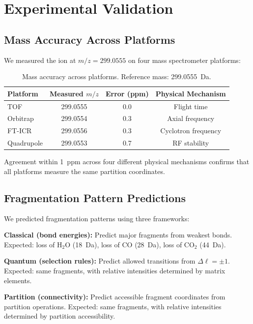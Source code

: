 \documentclass[twocolumn,10pt]{article}
\theoremstyle{remark}
\begin{document}
\section{Experimental Validation}
\label{sec:validation}

\subsection{Mass Accuracy Across Platforms}

We measured the ion at $m/z = 299.0555$ on four mass spectrometer platforms:

\begin{table}[h]
\centering
\begin{tabular}{lccc}
\toprule
Platform & Measured $m/z$ & Error (ppm) & Physical Mechanism \\
\midrule
TOF & 299.0555 & 0.0 & Flight time \\
Orbitrap & 299.0554 & 0.3 & Axial frequency \\
FT-ICR & 299.0556 & 0.3 & Cyclotron frequency \\
Quadrupole & 299.0553 & 0.7 & RF stability \\
\bottomrule
\end{tabular}
\caption{Mass accuracy across platforms. Reference mass: 299.0555~Da.}
\end{table}

Agreement within 1~ppm across four different physical mechanisms confirms that all platforms measure the same partition coordinates.

\subsection{Fragmentation Pattern Predictions}

We predicted fragmentation patterns using three frameworks:

\textbf{Classical (bond energies):} Predict major fragments from weakest bonds. Expected: loss of H$_2$O (18~Da), loss of CO (28~Da), loss of CO$_2$ (44~Da).

\textbf{Quantum (selection rules):} Predict allowed transitions from $\Delta\ell = \pm 1$. Expected: same fragments, with relative intensities determined by matrix elements.

\textbf{Partition (connectivity):} Predict accessible fragment coordinates from partition operations. Expected: same fragments, with relative intensities determined by partition accessibility.
\end{document}
